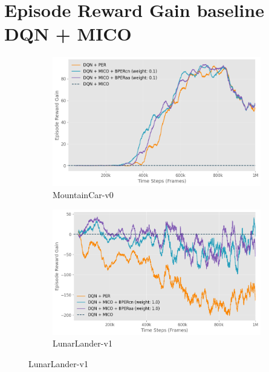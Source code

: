 \section{Episode Reward Gain baseline DQN + MICO}
\label{append:episode_reward_gain_dqn_mico}

\begin{figure}[h]
    \centering
    \begin{subfigure}{0.45\textwidth}
    \includegraphics[width=\linewidth]{Results/general_results/mountain_car_reward_gain_vs_dqn_mico.png}
        \caption{MountainCar-v0}
        \label{fig:mountain_car_reward_gain_vs_dqn_mico}
    \end{subfigure}
    \hfill
    \begin{subfigure}{0.45\textwidth}
        \includegraphics[width=\linewidth]{Results/general_results/lunarlander_reward_gain_vs_dqn_mico.png}
        \caption{LunarLander-v1}
        \label{fig:lunarlander_reward_gain_vs_dqn_mico}
    \end{subfigure}
    \hfill

\end{figure}
